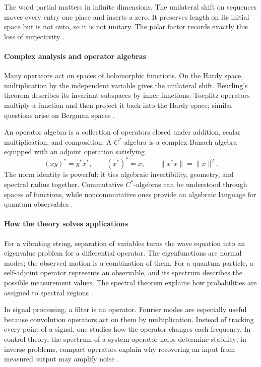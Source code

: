 The word partial matters in infinite dimensions. The unilateral shift on sequences moves every entry one place and inserts a zero. It preserves length on its initial space but is not onto, so it is not unitary. The polar factor records exactly this loss of surjectivity \cite{operator_theory_ref3}.

\paragraph{Complex analysis and operator algebras}
Many operators act on spaces of holomorphic functions. On the Hardy space, multiplication by the independent variable gives the unilateral shift. Beurling's theorem describes its invariant subspaces by inner functions. Toeplitz operators multiply a function and then project it back into the Hardy space; similar questions arise on Bergman spaces \cite{operator_theory_ref5}.

An operator algebra is a collection of operators closed under addition, scalar multiplication, and composition. A $C^*$-algebra is a complex Banach algebra equipped with an adjoint operation satisfying
\[
(xy)^*=y^*x^*,\qquad (x^*)^*=x,\qquad \|x^*x\|=\|x\|^2.
\]
The norm identity is powerful: it ties algebraic invertibility, geometry, and spectral radius together. Commutative $C^*$-algebras can be understood through spaces of functions, while noncommutative ones provide an algebraic language for quantum observables \cite{operator_theory_ref4}.

\paragraph{How the theory solves applications}
For a vibrating string, separation of variables turns the wave equation into an eigenvalue problem for a differential operator. The eigenfunctions are normal modes; the observed motion is a combination of them. For a quantum particle, a self-adjoint operator represents an observable, and its spectrum describes the possible measurement values. The spectral theorem explains how probabilities are assigned to spectral regions \cite{operator_theory_ref1}.

In signal processing, a filter is an operator. Fourier modes are especially useful because convolution operators act on them by multiplication. Instead of tracking every point of a signal, one studies how the operator changes each frequency. In control theory, the spectrum of a system operator helps determine stability; in inverse problems, compact operators explain why recovering an input from measured output may amplify noise \cite{operator_theory_ref2,operator_theory_ref3}.

